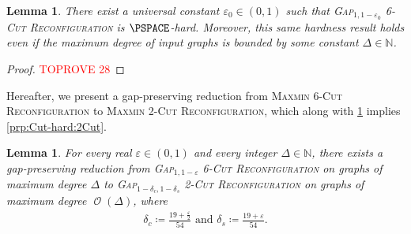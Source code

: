 \documentclass[11pt,fleqn]{article}
\renewcommand{\epsilon}{\varepsilon}
\newcommand{\prb}[1]{\textsc{#1}\xspace}
\newcommand{\defeq}{\coloneq}
\DeclareMathOperator{\bigO}{\mathcal{O}}
\newcommand{\twoCutReconf}{\prb{2-Cut Reconfiguration}}
\newcommand{\sixCutReconf}{\prb{6-Cut Reconfiguration}}
\newcommand{\MMtwoCutReconf}{\prb{Maxmin 2-Cut Reconfiguration}}
\newcommand{\MMsixCutReconf}{\prb{Maxmin 6-Cut Reconfiguration}}
\newcommand{\bbN}{\mathbb{N}}
\newtheorem{lemma}[theorem]{Lemma}
\theoremstyle{definition}
\numberwithin{equation}{section}
\begin{document}
\begin{lemma}
\label{lem:Cut-hard:6Cut}
    There exist a universal constant $\epsilon_0 \in (0,1)$ such that
    \prb{Gap$_{1,1-\epsilon_0}$ \sixCutReconf} is $\PSPACE$-hard.
    Moreover, this same hardness result holds even if 
    the maximum degree of input graphs is bounded by some constant $\Delta \in \bbN$.
\end{lemma}
\begin{proof}\textcolor{red}{TOPROVE 28}\end{proof}



Hereafter, we present a gap-preserving reduction from
\MMsixCutReconf to \MMtwoCutReconf,
which along with \cref{lem:Cut-hard:6Cut} implies \cref{prp:Cut-hard:2Cut}.


\begin{lemma}
\label{lem:Cut-hard:6-to-2}
    For every real $\epsilon \in (0,1)$ and
    every integer $\Delta \in \bbN$,
    there exists a gap-preserving reduction from
    \prb{Gap$_{1,1-\epsilon}$ \sixCutReconf}
    on graphs of maximum degree $\Delta$
    to
    \prb{Gap$_{1-\delta_c,1-\delta_s}$ \twoCutReconf}
    on graphs of maximum degree $\bigO(\Delta)$, where
    \begin{align}
        \delta_c \defeq \frac{19+\frac{\epsilon}{2}}{54} \text{ and }
        \delta_s \defeq \frac{19+\epsilon}{54}.
    \end{align}
\end{lemma}
\end{document}
